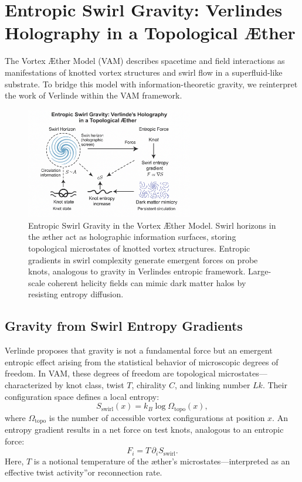 \section{Entropic Swirl Gravity: Verlinde\rqs s Holography in a Topological Æther}

The Vortex Æther Model (VAM) describes spacetime and field interactions as manifestations of knotted vortex structures and swirl flow in a superfluid-like substrate. To bridge this model with information-theoretic gravity, we reinterpret the work of Verlinde \cite{Verlinde2011,Verlinde2016} within the VAM framework.

\begin{figure}[h!]
\centering
\includegraphics[width=0.65\textwidth]{images/ErikVerlinde}
\caption{Entropic Swirl Gravity in the Vortex Æther Model.
Swirl horizons in the æther act as holographic information surfaces, storing topological microstates of knotted vortex structures. Entropic gradients in swirl complexity generate emergent forces on probe knots, analogous to gravity in Verlinde\rqs s entropic framework. Large-scale coherent helicity fields can mimic dark matter halos by resisting entropy diffusion.}
\end{figure}

\subsection*{Gravity from Swirl Entropy Gradients}

Verlinde proposes that gravity is not a fundamental force but an emergent entropic effect arising from the statistical behavior of microscopic degrees of freedom. In VAM, these degrees of freedom are topological microstates—characterized by knot class, twist $T$, chirality $C$, and linking number $Lk$. Their configuration space defines a local entropy:
\begin{equation}
S_{\text{swirl}}(x) = k_B \log \Omega_{\text{topo}}(x),
\end{equation}
where $\Omega_{\text{topo}}$ is the number of accessible vortex configurations at position $x$. An entropy gradient results in a net force on test knots, analogous to an entropic force:
\begin{equation}
F_i = T \, \partial_i S_{\text{swirl}}.
\end{equation}
Here, $T$ is a notional temperature of the æther's microstates—interpreted as an effective \grqq twist activity\textquotedblright or reconnection rate.

